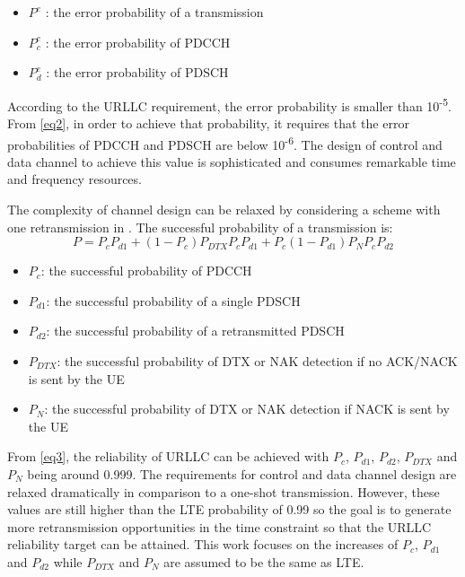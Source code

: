 \documentclass[conference]{IEEEtran}
\begin{document}
\begin{itemize}
    \item $P^{e}$ : the error probability of a transmission
    \item $P^{e}_{c}$ : the error probability of PDCCH 
    \item $P^{e}_{d}$ : the error probability of PDSCH
\end{itemize}

According to the URLLC requirement, the error probability is smaller than 10\textsuperscript{-5}. From \eqref{eq2}, in order to achieve that probability, it requires that the error probabilities of PDCCH and PDSCH are below 10\textsuperscript{-6}. The design of control and data channel to achieve this value is sophisticated and consumes remarkable time and frequency resources.

The complexity of channel design can be relaxed by considering a scheme with one retransmission in \cite{b7}. The successful probability of a transmission is:
\begin{equation}
P = P_{c}P_{d1} + (1-P_{c})P_{DTX}P_{c}P_{d1} + P_{c}(1-P_{d1})P_{N}P_{c}P_{d2}\label{eq3}
\end{equation}
\begin{itemize}
    \item $P_{c}$: the successful probability of PDCCH
    \item $P_{d1}$: the successful probability of a single PDSCH
    \item $P_{d2}$: the successful probability of a retransmitted PDSCH
    \item $P_{DTX}$: the successful probability of DTX or NAK detection if no ACK/NACK is sent by the UE
    \item $P_{N}$: the successful probability of DTX or NAK detection if NACK is sent by the UE
\end{itemize}

From \eqref{eq3}, the reliability of URLLC can be achieved with $P_{c}$, $P_{d1}$, $P_{d2}$, $P_{DTX}$ and $P_{N}$ being around 0.999. The requirements for control and data channel design are relaxed dramatically in comparison to a one-shot transmission. However, these values are still higher than the LTE probability of 0.99 so the goal is to generate more retransmission opportunities in the time constraint  so  that  the  URLLC  reliability  target  can be attained. This work focuses on the increases of $P_{c}$, $P_{d1}$ and $P_{d2}$ while $P_{DTX}$ and $P_{N}$ are assumed to be the same as LTE.
\end{document}
